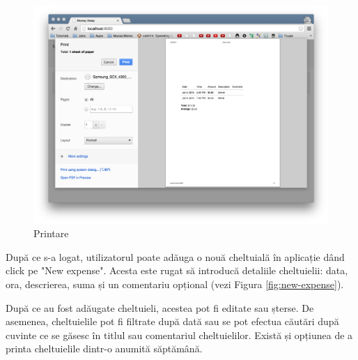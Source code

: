 \begin{figure}
  \includegraphics[width=1\textwidth]{./chap5-files/print_weekly2}
  \caption{Printare}
  \label{fig:list-expenses}
\end{figure}

După ce s-a logat, utilizatorul poate adăuga o nouă cheltuială în aplicație
dând click pe "New expense". Acesta este rugat să introducă detaliile
cheltuielii: data, ora, descrierea, suma și un comentariu opțional
(vezi Figura \ref{fig:new-expense}).

După ce au fost adăugate cheltuieli, acestea pot fi editate sau șterse.
De asemenea, cheltuielile pot fi filtrate după dată sau se pot
efectua căutări după cuvinte ce se găsesc în titlul sau comentariul
cheltuielilor. Există și opțiunea de a printa cheltuielile dintr-o
anumită săptămână.


